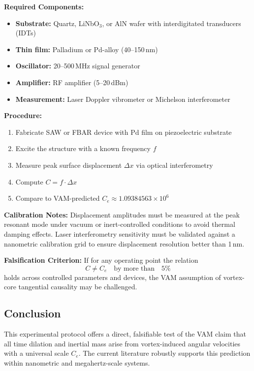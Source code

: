    \textbf{Required Components:}
    \begin{itemize}
        \item \textbf{Substrate:} Quartz, LiNbO$_3$, or AlN wafer with interdigitated transducers (IDTs)
        \item \textbf{Thin film:} Palladium or Pd-alloy (40--150\,nm)
        \item \textbf{Oscillator:} 20--500\,MHz signal generator
        \item \textbf{Amplifier:} RF amplifier (5--20\,dBm)
        \item \textbf{Measurement:} Laser Doppler vibrometer or Michelson interferometer
    \end{itemize}

    \textbf{Procedure:}
    \begin{enumerate}
        \item Fabricate SAW or FBAR device with Pd film on piezoelectric substrate
        \item Excite the structure with a known frequency $f$
        \item Measure peak surface displacement $\Delta x$ via optical interferometry
        \item Compute $C = f \cdot \Delta x$
        \item Compare to VAM-predicted $C_e \approx 1.09384563 \times 10^6$\,
    \end{enumerate}

    \textbf{Calibration Notes:} Displacement amplitudes must be measured at the peak resonant mode under vacuum or inert-controlled conditions to avoid thermal damping effects. Laser interferometry sensitivity must be validated against a nanometric calibration grid to ensure displacement resolution better than 1\,nm.

    \textbf{Falsification Criterion:} If for any operating point the relation
    \[
        C \ne C_e \quad \text{by more than} \quad 5\%
    \]
    holds across controlled parameters and devices, the VAM assumption of vortex-core tangential causality may be challenged.

    \subsection*{Conclusion}
    This experimental protocol offers a direct, falsifiable test of the VAM claim that all time dilation and inertial mass arise from vortex-induced angular velocities with a universal scale $C_e$. The current literature robustly supports this prediction within nanometric and megahertz-scale systems.

